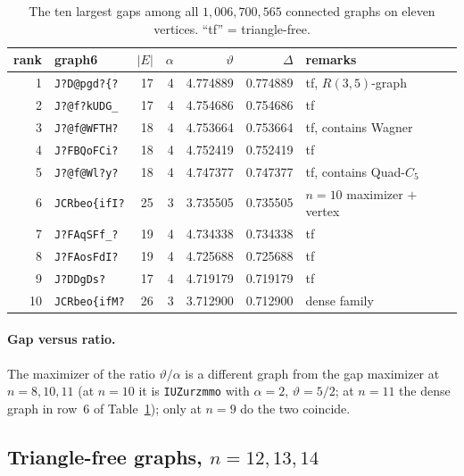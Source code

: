 \documentclass[11pt]{article}
\renewcommand{\theta}{\vartheta}
\newcommand{\gap}{\Delta}
\newcommand{\g}[1]{\texttt{#1}}
\begin{document}
\begin{table}[t]
\centering\small
\caption{The ten largest gaps among all $1{,}006{,}700{,}565$ connected graphs on eleven vertices. ``tf'' = triangle-free.}
\label{tab:n11}
\begin{tabular}{rlrrrrl}
\toprule
rank & graph6 & $|E|$ & $\alpha$ & $\theta$ & $\gap$ & remarks \\
\midrule
1 & \g{J?\textasciigrave{}D@pgd?\{?} & 17 & 4 & 4.774889 & 0.774889 & tf, $R(3,5)$-graph \\
2 & \g{J?\textasciigrave{}@f?kUDG\_} & 17 & 4 & 4.754686 & 0.754686 & tf \\
3 & \g{J?\textasciigrave{}@f@WFTH?} & 18 & 4 & 4.753664 & 0.753664 & tf, contains Wagner \\
4 & \g{J?\textasciigrave{}FBQoFCi?} & 18 & 4 & 4.752419 & 0.752419 & tf \\
5 & \g{J?\textasciigrave{}@f@Wl?y?} & 18 & 4 & 4.747377 & 0.747377 & tf, contains Quad-$C_5$ \\
6 & \g{JCRbeo\{ifI?} & 25 & 3 & 3.735505 & 0.735505 & $n{=}10$ maximizer $+$ vertex \\
7 & \g{J?\textasciigrave{}FAqSFf\_?} & 19 & 4 & 4.734338 & 0.734338 & tf \\
8 & \g{J?\textasciigrave{}FAosFdI?} & 19 & 4 & 4.725688 & 0.725688 & tf \\
9 & \g{J?\textasciigrave{}DD\textasciigrave{}gD\textasciigrave{}s?} & 17 & 4 & 4.719179 & 0.719179 & tf \\
10 & \g{JCRbeo\{ifM?} & 26 & 3 & 3.712900 & 0.712900 & dense family \\
\bottomrule
\end{tabular}
\end{table}

\paragraph{Gap versus ratio.} The maximizer of the ratio $\theta/\alpha$ is a different graph from the gap maximizer at $n=8,10,11$ (at $n=10$ it is \g{IUZurzmmo} with $\alpha=2$, $\theta=5/2$; at $n=11$ the dense graph in row~6 of Table~\ref{tab:n11}); only at $n=9$ do the two coincide.

\subsection{Triangle-free graphs, $n=12,13,14$}
\end{document}
